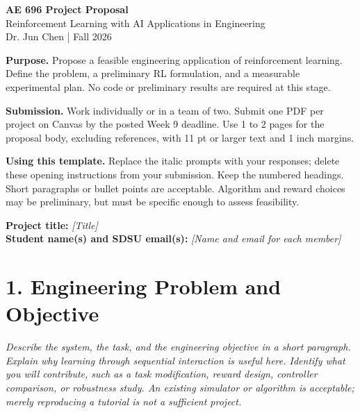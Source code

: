 \documentclass[11pt,letterpaper]{article}
\newcommand{\prompt}[1]{{\itshape #1}}
\begin{document}
\begin{center}
{\large\bfseries\color{SDSUDarkRed} AE 696 Project Proposal}\\[3pt]
Reinforcement Learning with AI Applications in Engineering\\
Dr. Jun Chen \quad | \quad Fall 2026
\end{center}

\textbf{Purpose.} Propose a feasible engineering application of reinforcement
learning. Define the problem, a preliminary RL formulation, and a measurable
experimental plan. No code or preliminary results are required at this stage.

\textbf{Submission.} Work individually or in a team of two. Submit one PDF per
project on Canvas by the posted Week 9 deadline. Use 1 to 2 pages for the proposal
body, excluding references, with 11 pt or larger text and 1 inch margins.

\textbf{Using this template.} Replace the italic prompts with your responses;
delete these opening instructions from your submission. Keep the numbered
headings. Short paragraphs or bullet points are acceptable. Algorithm and reward
choices may be preliminary, but must be specific enough to assess feasibility.

\textbf{Project title:} \prompt{[Title]}\\
\textbf{Student name(s) and SDSU email(s):} \prompt{[Name and email for each member]}

\section*{1. Engineering Problem and Objective}
\prompt{Describe the system, the task, and the engineering objective in a short
paragraph. Explain why learning through sequential interaction is useful here.
Identify what you will contribute, such as a task modification, reward design,
controller comparison, or robustness study. An existing simulator or algorithm
is acceptable; merely reproducing a tutorial is not a sufficient project.}
\end{document}

